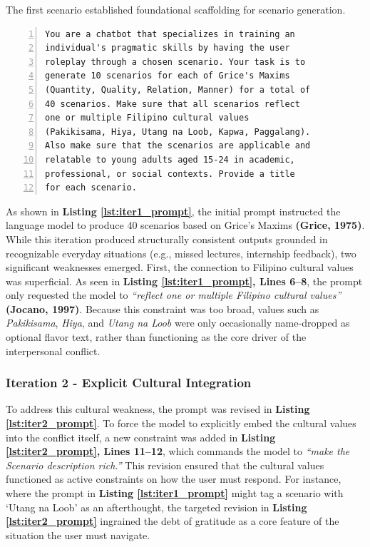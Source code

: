 The first scenario established foundational scaffolding for scenario generation.

\begin{lstlisting}[caption={Iteration 1: Baseline Scenario Generation Prompt Utilizing Grice's Maxims}, label=lst:iter1_prompt, numbers=left]
You are a chatbot that specializes in training an
individual's pragmatic skills by having the user
roleplay through a chosen scenario. Your task is to
generate 10 scenarios for each of Grice's Maxims
(Quantity, Quality, Relation, Manner) for a total of
40 scenarios. Make sure that all scenarios reflect
one or multiple Filipino cultural values
(Pakikisama, Hiya, Utang na Loob, Kapwa, Paggalang).
Also make sure that the scenarios are applicable and
relatable to young adults aged 15-24 in academic,
professional, or social contexts. Provide a title
for each scenario.
\end{lstlisting}

As shown in \textbf{Listing \ref{lst:iter1_prompt}}, the initial prompt instructed the language model to produce 40 scenarios based on Grice's Maxims \textbf{(Grice, 1975)}. While this iteration produced structurally consistent outputs grounded in recognizable everyday situations (e.g., missed lectures, internship feedback), two significant weaknesses emerged. First, the connection to Filipino cultural values was superficial. As seen in \textbf{Listing \ref{lst:iter1_prompt}, Lines 6--8}, the prompt only requested the model to \textit{``reflect one or multiple Filipino cultural values''} \textbf{(Jocano, 1997)}. Because this constraint was too broad, values such as \textit{Pakikisama}, \textit{Hiya}, and \textit{Utang na Loob} were only occasionally name-dropped as optional flavor text, rather than functioning as the core driver of the interpersonal conflict.

\subsubsection{Iteration 2 - Explicit Cultural Integration}

To address this cultural weakness, the prompt was revised in \textbf{Listing \ref{lst:iter2_prompt}}. To force the model to explicitly embed the cultural values into the conflict itself, a new constraint was added in \textbf{Listing \ref{lst:iter2_prompt}, Lines 11--12}, which commands the model to \textit{``make the Scenario description rich.''} This revision ensured that the cultural values functioned as active constraints on how the user must respond. For instance, where the prompt in \textbf{Listing \ref{lst:iter1_prompt}} might tag a scenario with `Utang na Loob' as an afterthought, the targeted revision in \textbf{Listing \ref{lst:iter2_prompt}} ingrained the debt of gratitude as a core feature of the situation the user must navigate.


